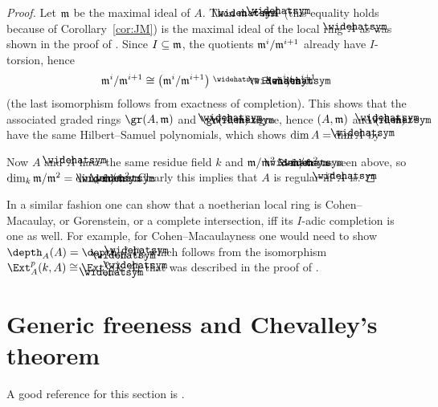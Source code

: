 \documentclass[a4paper,parskip=half,numbers=enddot, DIV=12]{scrreprt}
\begin{document}
\begin{proof}
	Let $\mathfrak{m}$ be the maximal ideal of $A$. Then $\roof{\mm}=\mm\roof{A}$ (this equality holds because of Corollary~\ref{cor:JM}) is the maximal ideal of the local ring $\roof{A}$ as was shown in the proof of \cite[Corollary~2.2.2]{homalg}. Since $I\subseteq \mathfrak{m}$, the quotients $\mathfrak{m}^i/\mathfrak{m}^{i+1}$ already have $I$-torsion, hence 
	\begin{align*}
		\mm^i/\mm^{i+1}\cong \left(\mm^i/\mm^{i+1}\right)^\complete\cong \roof{\mm}^i/\roof{\mm}^{i+1}
	\end{align*}
	(the last isomorphism follows from exactness of completion). This shows that the associated graded rings $\gr(A,\mm)$ and $\gr(\roof{A},\roof{\mm})$ agree, hence $(A,\mathfrak{m})$ and $(\roof{A},\roof{\mm})$ have the same Hilbert--Samuel polynomials, which shows $\dim A=\dim\roof{A}$ by \cite[Theorem~20]{alg2}.
	
	Now $A$ and $\roof{A}$ have the same residue field $k$ and $\mm/\mm^2\cong \roof{\mm}/\roof{\mm}^2$ as seen above, so $\dim_k\mm/\mm^2=\dim_k\roof{\mm}/\roof{\mm}^2$. Clearly this implies that $A$ is regular iff $\roof{A}$ is.
\end{proof}
\begin{rem}
	In a similar fashion one can show that a noetherian local ring is Cohen--Macaulay, or Gorenstein, or a complete intersection, iff its $I$-adic completion is one as well. For example, for Cohen--Macaulayness one would need to show $\depth_A(A)=\depth_{\roof{A}}(\roof{A})$, which follows from the isomorphism $\Ext_A^p(k,A)\cong\Ext_{\roof{A}}^p(k,\roof{A})$ that was described in the proof of \cite[Proposition~2.4.2]{homalg}.
\end{rem}
\section{Generic freeness and Chevalley's theorem}
A good reference for this section is \cite[Section~14.2 and 14.3]{eisenbudCommAlg}. 
\end{document}
